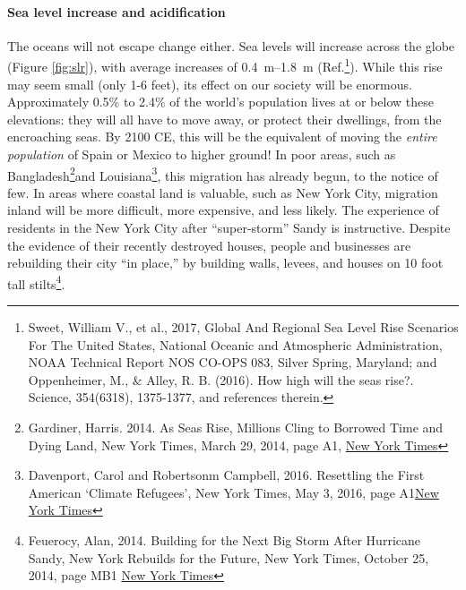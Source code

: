 \documentclass[amstex,12pt]{book}
\begin{document}
\paragraph{Sea level increase and acidification}\label{sl_acid}
The oceans will not escape change either. Sea levels will increase across the globe (Figure \ref{fig:slr}), with average increases of \SIrange{0.4}{1.8}{\metre} (Ref.\footnote{Sweet, William V., et al., 2017, Global And Regional Sea Level Rise Scenarios For The United States, National Oceanic and Atmospheric Administration, NOAA Technical Report NOS CO-OPS 083, Silver Spring, Maryland; and Oppenheimer, M., \& Alley, R. B. (2016). How high will the seas rise?. Science, 354(6318), 1375-1377, and references therein.}). While this rise may seem small (only 1-6 feet), its effect on our society will be enormous. Approximately 0.5\% to 2.4\% of the world's population lives at or below these elevations: they will all have to move away, or protect their dwellings, from the encroaching seas. By 2100 CE, this will be the equivalent of moving the \emph{entire population} of Spain or Mexico to higher ground! In poor areas, such as Bangladesh\footnote{Gardiner, Harris. 2014. As Seas Rise, Millions Cling to Borrowed Time and Dying Land, New York Times, March 29, 2014, page A1, \href{https://www.nytimes.com/2014/03/29/world/asia/facing-rising-seas-bangladesh-confronts-the-consequences-of-climate-change.html}{New York Times}}and Louisiana\footnote{Davenport, Carol and Robertsonm Campbell, 2016. Resettling the First American ‘Climate Refugees’, New York Times, May 3, 2016, page A1\href{https://www.nytimes.com/2016/05/03/us/resettling-the-first-american-climate-refugees.html}{New York Times}}, this migration has already begun, to the notice of few. In areas where coastal land is valuable, such as New York City, migration inland will be  more difficult, more expensive, and less likely. The experience of residents in the New York City after ``super-storm'' Sandy is instructive. Despite the evidence of their recently destroyed houses, people and businesses are rebuilding their city ``in place,'' by building walls, levees, and houses on 10 foot tall stilts\footnote{Feuerocy, Alan, 2014. Building for the Next Big Storm After Hurricane Sandy, New York Rebuilds for the Future, New York Times, October 25, 2014, page MB1 \href{https://www.nytimes.com/2014/10/26/nyregion/after-hurricane-sandy-new-york-rebuilds-for-the-future.html}{New York Times}}. \\
\end{document}
